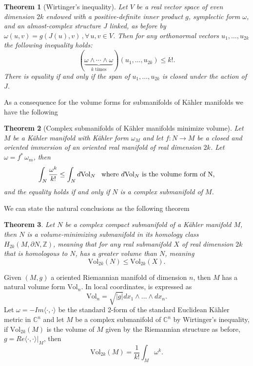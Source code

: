 \documentclass[12pt,twoside,a4paper]{report}
\newtheorem{theorem}{Theorem}[section]
\newcommand{\zah}{\ensuremath{ \mathbb Z }}
\newcommand{\con}{\ensuremath{\mathbb{C}^n}}
\begin{document}
  \begin{theorem}[Wirtinger's inequality]Let $V$  be a real vector space  of even dimension $2k$ endowed with a positive-definite inner product $g$, symplectic form $\omega$, and  an almost-complex structure $J$  linked, as before by $\omega(u, v) = g(J(u), v)\, ,\forall\,u,v\in{V}$. Then for any orthonormal vectors $u_1, \dots, u_{2k}$ the following inequality holds:
    \[
      (\underbrace {\omega \wedge \cdots \wedge \omega }_{k{\text{ times}}})(u_{1},\ldots ,u_{2k})\leq k!.
    \]
  There is equality if and only if the span of $u_1,\dots, u_{2k}$ is closed under the action of $J$.
  \end{theorem}
  As a consequence for the volume forms for submanifolds of K\"ahler manifolds we have the following
  \begin{theorem}[Complex submanifolds of Kähler manifolds minimize volume]
  Let $M$ be a K\"ahler manifold with K\"ahler form $\omega_M$ and let $f:N\rightarrow M$ be a closed and oriented immersion
  of an oriented real manifold of real dimension $2k$. Let $\omega=f^*\,\omega_m$, then
  \begin{equation}
              \int_{N} \frac{\omega^k}{k!}\leq \int_N d\textrm{Vol}_N\hspace{0.3cm}\text{where }d\textrm{Vol}_N\text{ is the volume form of N,}
  \end{equation}
  and the equality holds if and only if $N$ is a complex submanifold of $M$.
  \end{theorem}
  We can state the natural conclusions as the following theorem
  \begin{theorem}\label{wirtinger}
          Let $N$ be a complex compact submanifold of a K\"ahler manifold $M$, then $N$ is a volume-minimizing submanifold in its homology class $H_{2k}(M,\partial N,\zah)$, meaning that for any real submanifold $X$ of real dimension $2k$ that is homologous to $N$, has a greater volume than $N$, meaning
          \[
            \mathrm{Vol}_{2k}(N)\leq \mathrm{Vol}_{2k}(X).
          \]
  \end{theorem}
  Given $(M,g)$ a oriented Riemannian manifold of dimension $n$, then $M$ has a natural volume form $\textrm{Vol}_{n}$. In local coordinates, is expressed as
  \[
  \textrm{Vol}_{n}=\sqrt{|g|}dx_{1}\wedge\dots\wedge dx_{n}.
  \]
  Let $\omega=-Im\langle\cdot,\cdot\rangle$ be the standard 2-form of the standard Euclidean K\"ahler metric in $\con$ and let $M$ be a complex submanifold of $\con$ by Wirtinger's inequality, if $\textrm{Vol}_{2k}(M)$ is the volume of $M$ given by the Riemannian structure as before, $g=Re\langle\cdot,\cdot\rangle\vert_{M}$, then
  \begin{equation}
          \textrm{Vol}_{2k}(M)= \frac{1}{k!}\int_M \omega^k.
  \end{equation}
\end{document}
